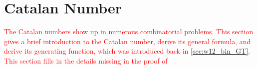 \section{Catalan Number} \label{app:Catalan}
\textcolor{red}{The Catalan numbers show up in numerous combinatorial problems. This section gives a brief introduction to the Catalan number, derive its general formula, and derive its generating function, which was introduced back in \autoref{sec:w12_bin_GT}. This section fills in the details missing in the proof of }
